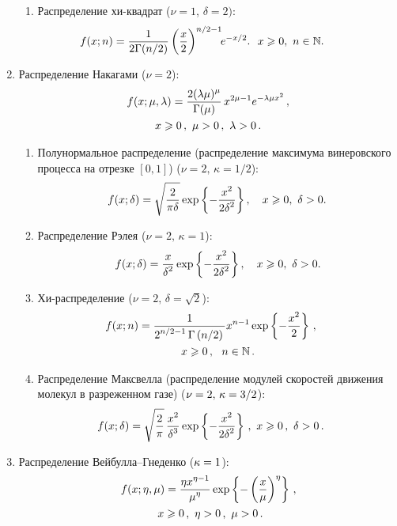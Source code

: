 \begin{multicols}{2}
\begin{enumerate}[1.]
\begin{enumerate}[{1.}1.]
\item Распределение хи-квадрат ($\nu=1$, $\delta=2)$:
$$%
\hspace*{-28pt}f(x;n)=\fr{1}{2\Gamma({n}/{2})}\left(\fr{x}{2}\right)^{n/2-1}\!\!e^{-x/2}.
\ \ x\geqslant0,\ n\in\mathbb{N}.
$$
\end{enumerate}
\item Распределение Накагами ($\nu=2$):
\begin{multline*}
f(x;\mu,\lambda)=\displaystyle\frac{\displaystyle 2(\lambda\mu)^{\mu}\mathstrut}{\displaystyle \Gamma(\mu)\mathstrut}\,x^{2\mu-1}e^{-\lambda\mu
x^2}\,,\\
 x\geqslant0\,, \ \mu>0\,,\ \lambda>0\,.
\end{multline*}
\begin{enumerate}[{2.}1.]
\item Полунормальное распределение (распределение максимума
винеровского процесса на отрезке $[0,1]$)
($\nu=2,\,\kappa=1/2$):
$$%
\hspace*{-1.38493pt}f(x;\delta)=\sqrt{\fr{2}{\pi\delta}}\exp\left\{-\fr{x^2}{2\delta^2}\right\},\
\ \ x\geqslant0, \ \delta>0.
$$
\item Распределение Рэлея ($\nu=2,\,\kappa=1$):
$$%
f(x;\delta)=\fr{x}{\delta^2}\exp\left\{-\fr{x^2}{2\delta^2}\right\},\
\ \ x\geqslant0, \ \delta>0.
$$

\item Хи-распределение ($\nu=2,\,\delta=\sqrt{2}$):
\begin{multline*}
\hspace*{-13.01563pt}f(x;n)=\fr{1}{2^{n/2-1}\,\Gamma\left({n}/{2}\right)}x^{n-1}\exp\left\{-\fr{x^2}{2}\right\}\,,\\
 x\geqslant0\,, \ \ n\in\mathbb{N}\,.
\end{multline*}
\item Распределение Максвелла (распределение модулей скоростей движения
молекул в разреженном газе) ($\nu\hm=2,\,\kappa\hm=3/2$):
\begin{equation*}
\hspace*{-13.16995pt}f(x;\delta)=\sqrt{\fr{2}{\pi}}\,\fr{x^2}{\delta^3}\exp\left\{-\fr{x^2}{2\delta^2}\right\}\,,\
 x\geqslant0\,, \ \delta>0\,.
\end{equation*}
\end{enumerate}
\item Распределение Вейбулла--Гнеденко ($\kappa\hm=1$):
\begin{multline*}
f(x;\eta,\mu)=\displaystyle\frac{\displaystyle \eta
x^{\eta-1}\mathstrut}{\displaystyle \mu^{\eta}\mathstrut}\exp\left\{-\left(\displaystyle\frac{\displaystyle x\mathstrut}{\displaystyle \mu\mathstrut}\right)^{\eta}\right\}\,,\\\
x\geqslant0\,, \ \eta>0\,,\ \mu>0\,.
\end{multline*}


\end{enumerate}
\end{multicols}
